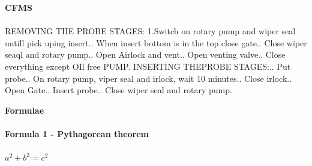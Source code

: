 \documentclass[idxtotoc,hyperref,openany,oneside]{labbook} %
\begin{document}
\huge \textbf{CFMS} \\ \\
REMOVING THE PROBE  STAGES:
\newline
1.Switch on rotary pump and wiper seal untill pick uping insert.. When insert bottom is in the top close gate.. Close wiper seaql and rotary pump.. Open Airlock and vent.. Open venting valve.. Close everything except OIl free PUMP.\newline
\newline
INSERTING THEPROBE STAGES:.. Put probe.. On rotary pump, viper seal and irlock, wait 10 minutes.. Close irlock.. Open Gate.. Insert probe.. Close wiper seal and rotary pump.\newline





\newpage

\huge \textbf{Formulae} \\ \\

\normalsize \textbf{Formula 1 - Pythagorean theorem}\\ \\
$a^2 + b^2 = c^2$\\ \\




\end{document}
